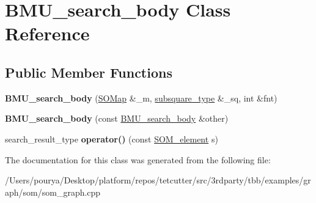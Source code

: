 \hypertarget{classBMU__search__body}{}\section{B\+M\+U\+\_\+search\+\_\+body Class Reference}
\label{classBMU__search__body}
\subsection*{Public Member Functions}
\begin{DoxyCompactItemize}
\item 
\hypertarget{classBMU__search__body_a86d3a2fb1dd09da01f729f773c43f3ae}{}{\bfseries B\+M\+U\+\_\+search\+\_\+body} (\hyperlink{classSOMap}{S\+O\+Map} \&\+\_\+m, \hyperlink{classtbb_1_1blocked__range2d}{subsquare\+\_\+type} \&\+\_\+sq, int \&fnt)\label{classBMU__search__body_a86d3a2fb1dd09da01f729f773c43f3ae}

\item 
\hypertarget{classBMU__search__body_a75c91e1aa519083c5fa3c8f888cffbbd}{}{\bfseries B\+M\+U\+\_\+search\+\_\+body} (const \hyperlink{classBMU__search__body}{B\+M\+U\+\_\+search\+\_\+body} \&other)\label{classBMU__search__body_a75c91e1aa519083c5fa3c8f888cffbbd}

\item 
\hypertarget{classBMU__search__body_a6e20a53a9bd3eeece9a07c48c6736a60}{}search\+\_\+result\+\_\+type {\bfseries operator()} (const \hyperlink{classSOM__element}{S\+O\+M\+\_\+element} s)\label{classBMU__search__body_a6e20a53a9bd3eeece9a07c48c6736a60}

\end{DoxyCompactItemize}


The documentation for this class was generated from the following file\+:\begin{DoxyCompactItemize}
\item 
/\+Users/pourya/\+Desktop/platform/repos/tetcutter/src/3rdparty/tbb/examples/graph/som/som\+\_\+graph.\+cpp\end{DoxyCompactItemize}
